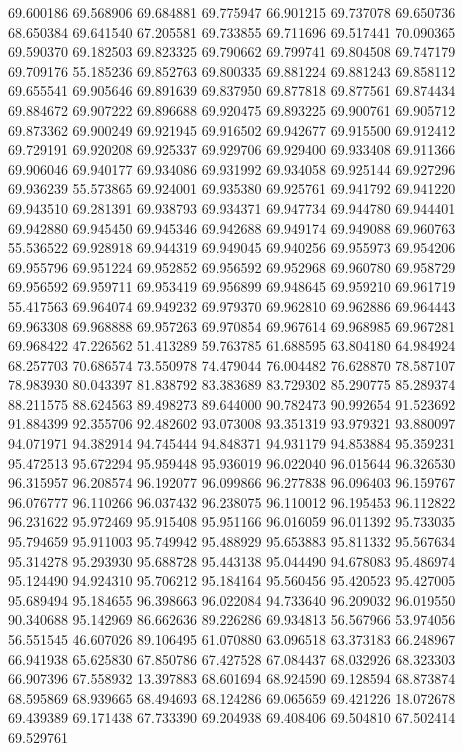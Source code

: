 69.600186
69.568906
69.684881
69.775947
66.901215
69.737078
69.650736
68.650384
69.641540
67.205581
69.733855
69.711696
69.517441
70.090365
69.590370
69.182503
69.823325
69.790662
69.799741
69.804508
69.747179
69.709176
55.185236
69.852763
69.800335
69.881224
69.881243
69.858112
69.655541
69.905646
69.891639
69.837950
69.877818
69.877561
69.874434
69.884672
69.907222
69.896688
69.920475
69.893225
69.900761
69.905712
69.873362
69.900249
69.921945
69.916502
69.942677
69.915500
69.912412
69.729191
69.920208
69.925337
69.929706
69.929400
69.933408
69.911366
69.906046
69.940177
69.934086
69.931992
69.934058
69.925144
69.927296
69.936239
55.573865
69.924001
69.935380
69.925761
69.941792
69.941220
69.943510
69.281391
69.938793
69.934371
69.947734
69.944780
69.944401
69.942880
69.945450
69.945346
69.942688
69.949174
69.949088
69.960763
55.536522
69.928918
69.944319
69.949045
69.940256
69.955973
69.954206
69.955796
69.951224
69.952852
69.956592
69.952968
69.960780
69.958729
69.956592
69.959711
69.953419
69.956899
69.948645
69.959210
69.961719
55.417563
69.964074
69.949232
69.979370
69.962810
69.962886
69.964443
69.963308
69.968888
69.957263
69.970854
69.967614
69.968985
69.967281
69.968422
47.226562
51.413289
59.763785
61.688595
63.804180
64.984924
68.257703
70.686574
73.550978
74.479044
76.004482
76.628870
78.587107
78.983930
80.043397
81.838792
83.383689
83.729302
85.290775
85.289374
88.211575
88.624563
89.498273
89.644000
90.782473
90.992654
91.523692
91.884399
92.355706
92.482602
93.073008
93.351319
93.979321
93.880097
94.071971
94.382914
94.745444
94.848371
94.931179
94.853884
95.359231
95.472513
95.672294
95.959448
95.936019
96.022040
96.015644
96.326530
96.315957
96.208574
96.192077
96.099866
96.277838
96.096403
96.159767
96.076777
96.110266
96.037432
96.238075
96.110012
96.195453
96.112822
96.231622
95.972469
95.915408
95.951166
96.016059
96.011392
95.733035
95.794659
95.911003
95.749942
95.488929
95.653883
95.811332
95.567634
95.314278
95.293930
95.688728
95.443138
95.044490
94.678083
95.486974
95.124490
94.924310
95.706212
95.184164
95.560456
95.420523
95.427005
95.689494
95.184655
96.398663
96.022084
94.733640
96.209032
96.019550
90.340688
95.142969
86.662636
89.226286
69.934813
56.567966
53.974056
56.551545
46.607026
89.106495
61.070880
63.096518
63.373183
66.248967
66.941938
65.625830
67.850786
67.427528
67.084437
68.032926
68.323303
66.907396
67.558932
13.397883
68.601694
68.924590
69.128594
68.873874
68.595869
68.939665
68.494693
68.124286
69.065659
69.421226
18.072678
69.439389
69.171438
67.733390
69.204938
69.408406
69.504810
67.502414
69.529761
